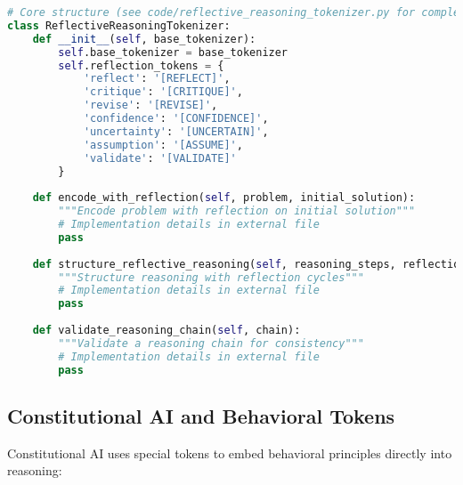 \begin{lstlisting}[language=Python, caption=Self-reflection and verification tokens]
# Core structure (see code/reflective_reasoning_tokenizer.py for complete implementation)
class ReflectiveReasoningTokenizer:
    def __init__(self, base_tokenizer):
        self.base_tokenizer = base_tokenizer
        self.reflection_tokens = {
            'reflect': '[REFLECT]',
            'critique': '[CRITIQUE]',
            'revise': '[REVISE]',
            'confidence': '[CONFIDENCE]',
            'uncertainty': '[UNCERTAIN]',
            'assumption': '[ASSUME]',
            'validate': '[VALIDATE]'
        }
        
    def encode_with_reflection(self, problem, initial_solution):
        """Encode problem with reflection on initial solution"""
        # Implementation details in external file
        pass
    
    def structure_reflective_reasoning(self, reasoning_steps, reflections):
        """Structure reasoning with reflection cycles"""
        # Implementation details in external file
        pass
    
    def validate_reasoning_chain(self, chain):
        """Validate a reasoning chain for consistency"""
        # Implementation details in external file
        pass
\end{lstlisting}

\subsection{Constitutional AI and Behavioral Tokens}

Constitutional AI uses special tokens to embed behavioral principles directly into reasoning:

